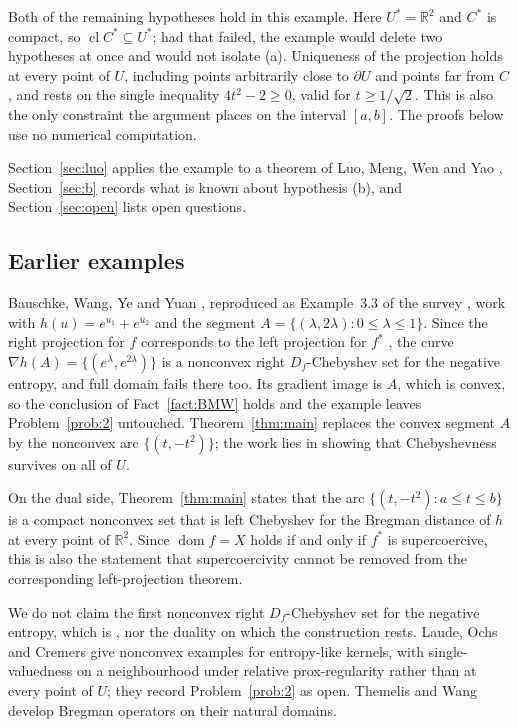 \documentclass[11pt]{amsart}
\theoremstyle{plain}
\theoremstyle{definition}
\theoremstyle{remark}
\newcommand{\R}{\mathbb{R}}
\newcommand{\dom}{\operatorname{dom}}
\newcommand{\cl}{\operatorname{cl}}
\newcommand{\D}{D_f}
\newcommand{\Cstar}{C^{*}}
\begin{document}
Both of the remaining hypotheses hold in this example. Here $U^{*} = \R^{2}$ and
$\Cstar$ is compact, so $\cl \Cstar \subseteq U^{*}$; had that failed, the
example would delete two hypotheses at once and would not isolate (a).
Uniqueness of the projection holds at every point of $U$, including points
arbitrarily close to $\partial U$ and points far from $C$, and rests on the
single inequality $4t^{2} - 2 \ge 0$, valid for $t \ge 1/\sqrt2$. This is also
the only constraint the argument places on the interval $[a,b]$. The proofs
below use no numerical computation.

Section~\ref{sec:luo} applies the example to a theorem of Luo, Meng, Wen and Yao
\cite{LMWY2019}, Section~\ref{sec:b} records what is known about hypothesis (b),
and Section~\ref{sec:open} lists open questions.

\subsection*{Earlier examples}

Bauschke, Wang, Ye and Yuan \cite[Example 7.5]{BWYY2009}, reproduced as
Example~3.3 of the survey \cite{BMW2010}, work with
$h(u) = e^{u_{1}} + e^{u_{2}}$ and the segment
$A = \{ (\lambda, 2\lambda) : 0 \le \lambda \le 1 \}$. Since the right
projection for $f$ corresponds to the left projection for $f^{*}$
\cite[Lemma 3.2]{LMWY2019}, the curve
$\nabla h(A) = \{ (e^{\lambda}, e^{2\lambda}) \}$ is a nonconvex right
$\D$-Chebyshev set for the negative entropy, and full domain fails there too.
Its gradient image is $A$, which is convex, so the conclusion of
Fact~\ref{fact:BMW} holds and the example leaves Problem~\ref{prob:2} untouched.
Theorem~\ref{thm:main} replaces the convex segment $A$ by the nonconvex arc
$\{ (t, -t^{2}) \}$; the work lies in showing that Chebyshevness survives on all
of $U$.

On the dual side, Theorem~\ref{thm:main} states that the arc
$\{ (t,-t^{2}) : a \le t \le b \}$ is a compact nonconvex set that is left
Chebyshev for the Bregman distance of $h$ at every point of $\R^{2}$. Since
$\dom f = X$ holds if and only if $f^{*}$ is supercoercive, this is also the
statement that supercoercivity cannot be removed from the corresponding
left-projection theorem.

We do not claim the first nonconvex right $\D$-Chebyshev set for the negative
entropy, which is \cite[Example 7.5]{BWYY2009}, nor the duality on which the
construction rests. Laude, Ochs and Cremers \cite{LOC2020} give nonconvex
examples for entropy-like kernels, with single-valuedness on a neighbourhood
under relative prox-regularity rather than at every point of $U$; they record
Problem~\ref{prob:2} as open. Themelis and Wang \cite{TW2025} develop Bregman
operators on their natural domains.
\end{document}
